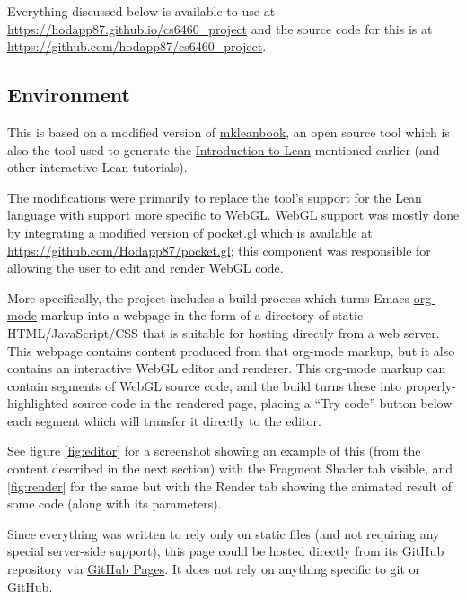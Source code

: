 \documentclass{sig-alternate-05-2015}
\begin{document}
Everything discussed below is available to use at
\url{https://hodapp87.github.io/cs6460_project} and the source code
for this is at \url{https://github.com/hodapp87/cs6460_project}.

\subsection{Environment}


This is based on a modified version of
\href{https://github.com/leanprover/mkleanbook}{mkleanbook}, an open
source tool which is also the tool used to generate the
\href{https://leanprover.github.io/introduction_to_lean/}{Introduction
  to Lean} mentioned earlier (and other interactive Lean tutorials).

The modifications were primarily to replace the tool's support for the
Lean language with support more specific to WebGL.  WebGL support was
mostly done by integrating a modified version of
\href{https://github.com/gportelli/pocket.gl}{pocket.gl} which is
available at \url{https://github.com/Hodapp87/pocket.gl}; this
component was responsible for allowing the user to edit and render
WebGL code.

More specifically, the project includes a build process which turns
Emacs \href{http://orgmode.org/}{org-mode} markup into a webpage in
the form of a directory of static HTML/JavaScript/CSS that is suitable
for hosting directly from a web server.  This webpage contains content
produced from that org-mode markup, but it also contains an
interactive WebGL editor and renderer.  This org-mode markup can
contain segments of WebGL source code, and the build turns these into
properly-highlighted source code in the rendered page, placing a ``Try
code'' button below each segment which will transfer it directly to
the editor.

See figure \ref{fig:editor} for a screenshot showing an example of
this (from the content described in the next section) with the
Fragment Shader tab visible, and \ref{fig:render} for the same but
with the Render tab showing the animated result of some code (along
with its parameters).

Since everything was written to rely only on static files (and not
requiring any special server-side support), this page could be hosted
directly from its GitHub repository via
\href{https://pages.github.com/}{GitHub Pages}.  It does not rely on
anything specific to git or GitHub.
\end{document}
